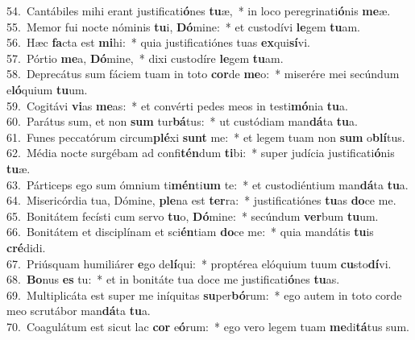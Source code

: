 {54.~}Cantábiles mihi erant justificati\textbf{ó}nes \textbf{tu}æ,~* in loco peregrinati\textbf{ó}nis \textbf{me}æ.\\
{55.~}Memor fui nocte nóminis \textbf{tu}i, \textbf{Dó}mine:~* et custodívi \textbf{le}gem \textbf{tu}am.\\
{56.~}Hæc \textbf{fa}cta est \textbf{mi}hi:~* quia justificatiónes tuas \textbf{ex}qui\textbf{sí}vi.\\
{57.~}Pórtio \textbf{me}a, \textbf{Dó}mine,~* dixi custodíre \textbf{le}gem \textbf{tu}am.\\
{58.~}Deprecátus sum fáciem tuam in toto \textbf{cor}de \textbf{me}o:~* miserére mei secúndum e\textbf{ló}quium \textbf{tu}um.\\
{59.~}Cogitávi \textbf{vi}as \textbf{me}as:~* et convérti pedes meos in testi\textbf{mó}nia \textbf{tu}a.\\
{60.~}Parátus sum, et non \textbf{sum} tur\textbf{bá}tus:~* ut custódiam man\textbf{dá}ta \textbf{tu}a.\\
{61.~}Funes peccatórum circum\textbf{plé}xi \textbf{sunt} me:~* et legem tuam non \textbf{sum} o\textbf{blí}tus.\\
{62.~}Média nocte surgébam ad confi\textbf{tén}dum \textbf{ti}bi:~* super judícia justificati\textbf{ó}nis \textbf{tu}æ.\\
{63.~}Párticeps ego sum ómnium ti\textbf{mén}ti\textbf{um} te:~* et custodiéntium man\textbf{dá}ta \textbf{tu}a.\\
{64.~}Misericórdia tua, Dómine, \textbf{ple}na est \textbf{ter}ra:~* justificatiónes \textbf{tu}as \textbf{do}ce me.\\
{65.~}Bonitátem fecísti cum servo \textbf{tu}o, \textbf{Dó}mine:~* secúndum \textbf{ver}bum \textbf{tu}um.\\
{66.~}Bonitátem et disciplínam et sci\textbf{én}tiam \textbf{do}ce me:~* quia mandátis \textbf{tu}is \textbf{cré}didi.\\
{67.~}Priúsquam humiliárer \textbf{e}go de\textbf{lí}qui:~* proptérea elóquium tuum \textbf{cu}sto\textbf{dí}vi.\\
{68.~}\textbf{Bo}nus \textbf{es} tu:~* et in bonitáte tua doce me justificati\textbf{ó}nes \textbf{tu}as.\\
{69.~}Multiplicáta est super me iníquitas \textbf{su}per\textbf{bó}rum:~* ego autem in toto corde meo scrutábor man\textbf{dá}ta \textbf{tu}a.\\
{70.~}Coagulátum est sicut lac \textbf{cor} e\textbf{ó}rum:~* ego vero legem tuam \textbf{me}di\textbf{tá}tus sum.\\
